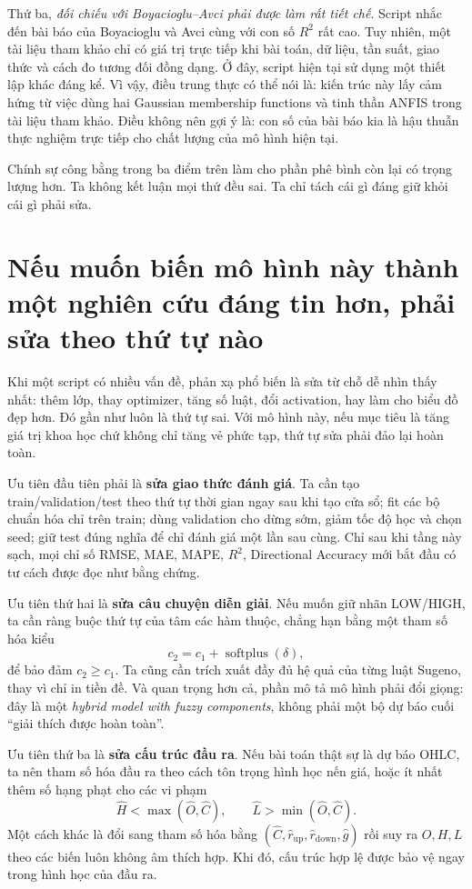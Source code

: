 Thứ ba, \emph{đối chiếu với Boyacioglu--Avci phải được làm rất tiết chế}. Script nhắc đến bài báo của Boyacioglu và Avci cùng với con số \(R^2\) rất cao. Tuy nhiên, một tài liệu tham khảo chỉ có giá trị trực tiếp khi bài toán, dữ liệu, tần suất, giao thức và cách đo tương đối đồng dạng. Ở đây, script hiện tại sử dụng một thiết lập khác đáng kể. Vì vậy, điều trung thực có thể nói là: kiến trúc này lấy cảm hứng từ việc dùng hai Gaussian membership functions và tinh thần ANFIS trong tài liệu tham khảo. Điều không nên gợi ý là: con số của bài báo kia là hậu thuẫn thực nghiệm trực tiếp cho chất lượng của mô hình hiện tại.

Chính sự công bằng trong ba điểm trên làm cho phần phê bình còn lại có trọng lượng hơn. Ta không kết luận mọi thứ đều sai. Ta chỉ tách cái gì đáng giữ khỏi cái gì phải sửa.

\section{Nếu muốn biến mô hình này thành một nghiên cứu đáng tin hơn, phải sửa theo thứ tự nào}

Khi một script có nhiều vấn đề, phản xạ phổ biến là sửa từ chỗ dễ nhìn thấy nhất: thêm lớp, thay optimizer, tăng số luật, đổi activation, hay làm cho biểu đồ đẹp hơn. Đó gần như luôn là thứ tự sai. Với mô hình này, nếu mục tiêu là tăng giá trị khoa học chứ không chỉ tăng vẻ phức tạp, thứ tự sửa phải đảo lại hoàn toàn.

Ưu tiên đầu tiên phải là \textbf{sửa giao thức đánh giá}. Ta cần tạo train/validation/test theo thứ tự thời gian ngay sau khi tạo cửa sổ; fit các bộ chuẩn hóa chỉ trên train; dùng validation cho dừng sớm, giảm tốc độ học và chọn seed; giữ test đúng nghĩa để chỉ đánh giá một lần sau cùng. Chỉ sau khi tầng này sạch, mọi chỉ số RMSE, MAE, MAPE, \(R^2\), Directional Accuracy mới bắt đầu có tư cách được đọc như bằng chứng.

Ưu tiên thứ hai là \textbf{sửa câu chuyện diễn giải}. Nếu muốn giữ nhãn LOW/HIGH, ta cần ràng buộc thứ tự của tâm các hàm thuộc, chẳng hạn bằng một tham số hóa kiểu
\[
c_2 = c_1 + \operatorname{softplus}(\delta),
\]
để bảo đảm \(c_2\ge c_1\). Ta cũng cần trích xuất đầy đủ hệ quả của từng luật Sugeno, thay vì chỉ in tiền đề. Và quan trọng hơn cả, phần mô tả mô hình phải đổi giọng: đây là một \emph{hybrid model with fuzzy components}, không phải một bộ dự báo cuối ``giải thích được hoàn toàn''.

Ưu tiên thứ ba là \textbf{sửa cấu trúc đầu ra}. Nếu bài toán thật sự là dự báo OHLC, ta nên tham số hóa đầu ra theo cách tôn trọng hình học nến giá, hoặc ít nhất thêm số hạng phạt cho các vi phạm
\[
\widehat H < \max(\widehat O,\widehat C),
\qquad
\widehat L > \min(\widehat O,\widehat C).
\]
Một cách khác là đổi sang tham số hóa bằng \((\widehat C,\widehat r_{\mathrm{up}},\widehat r_{\mathrm{down}},\widehat g)\) rồi suy ra \(O,H,L\) theo các biến luôn không âm thích hợp. Khi đó, cấu trúc hợp lệ được bảo vệ ngay trong hình học của đầu ra.

